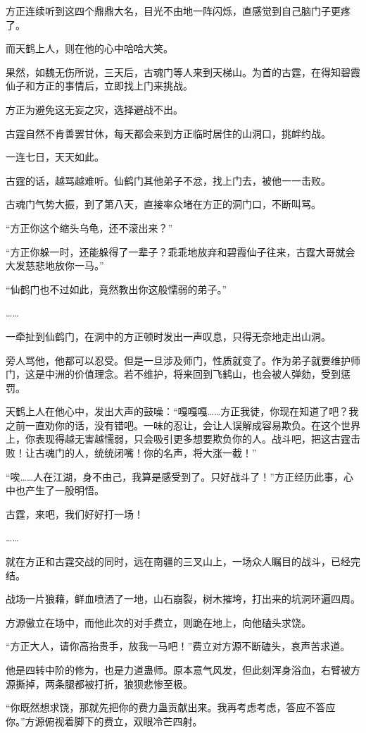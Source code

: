 \begin{this_body}
方正连续听到这四个鼎鼎大名，目光不由地一阵闪烁，直感觉到自己脑门子更疼了。

而天鹤上人，则在他的心中哈哈大笑。

果然，如魏无伤所说，三天后，古魂门等人来到天梯山。为首的古霆，在得知碧霞仙子和方正的事情后，立即找上门来挑战。

方正为避免这无妄之灾，选择避战不出。

古霆自然不肯善罢甘休，每天都会来到方正临时居住的山洞口，挑衅约战。

一连七日，天天如此。

古霆的话，越骂越难听。仙鹤门其他弟子不忿，找上门去，被他一一击败。

古魂门气势大振，到了第八天，直接率众堵在方正的洞门口，不断叫骂。

“方正你这个缩头乌龟，还不滚出来？”

“方正你躲一时，还能躲得了一辈子？乖乖地放弃和碧霞仙子往来，古霆大哥就会大发慈悲地放你一马。”

“仙鹤门也不过如此，竟然教出你这般懦弱的弟子。”

……

一牵扯到仙鹤门，在洞中的方正顿时发出一声叹息，只得无奈地走出山洞。

旁人骂他，他都可以忍受。但是一旦涉及师门，性质就变了。作为弟子就要维护师门，这是中洲的价值理念。若不维护，将来回到飞鹤山，也会被人弹劾，受到惩罚。

天鹤上人在他心中，发出大声的鼓噪：“嘎嘎嘎……方正我徒，你现在知道了吧？我之前一直劝你的话，没有错吧。一味的忍让，会让人误解成容易欺负。在这个世界上，你表现得越无害越懦弱，只会吸引更多想要欺负你的人。战斗吧，把这古霆击败！让古魂门的人，统统闭嘴！你的名声，将大涨一截！”

“唉……人在江湖，身不由己，我算是感受到了。只好战斗了！”方正经历此事，心中也产生了一股明悟。

古霆，来吧，我们好好打一场！

……

就在方正和古霆交战的同时，远在南疆的三叉山上，一场众人瞩目的战斗，已经完结。

战场一片狼藉，鲜血喷洒了一地，山石崩裂，树木摧垮，打出来的坑洞环遍四周。

方源傲立在场中，而他此次的对手费立，则跪在地上，向他磕头求饶。

“方正大人，请你高抬贵手，放我一马吧！”费立对方源不断磕头，哀声苦求道。

他是四转中阶的修为，也是力道蛊师。原本意气风发，但此刻浑身浴血，右臂被方源撕掉，两条腿都被打折，狼狈悲惨至极。

“你既然想求饶，那就先把你的费力蛊贡献出来。我再考虑考虑，答应不答应你。”方源俯视着脚下的费立，双眼冷芒四射。


\end{this_body}
